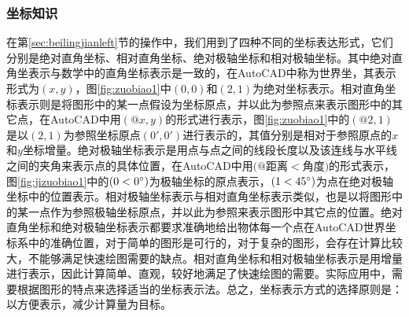 \subsubsection{坐标知识}
在第\ref{sec:beilingjianleft}节的操作中，我们用到了四种不同的坐标表达形式，它们分别是绝对直角坐标、相对直角坐标、绝对极轴坐标和相对极轴坐标。其中绝对直角坐表示与数学中的直角坐标表示是一致的，在AutoCAD中称为世界坐，其表示形式为$(x,y)$，图\ref{fig:zuobiao1}中$(0,0)$和$(2,1)$为绝对坐标表示。相对直角坐标表示则是将图形中的某一点假设为坐标原点，并以此为参照点来表示图形中的其它点，在AutoCAD中用$(@x,y)$的形式进行表示，图\ref{fig:zuobiao1}中的$(@2,1)$是以$(2,1)$为参照坐标原点$(0',0')$进行表示的，其值分别是相对于参照原点的$x$和$y$坐标增量。绝对极轴坐标表示是用点与点之间的线段长度以及该连线与水平线之间的夹角来表示点的具体位置，在AutoCAD中用$(@$距离$<$角度$)$的形式表示，图\ref{fig:jizuobiao1}中的$(0<0\degree)$为极轴坐标的原点表示，$(1<45\degree)$为点在绝对极轴坐标中的位置表示。相对极轴坐标表示与相对直角坐标表示类似，也是以将图形中的某一点作为参照极轴坐标原点，并以此为参照来表示图形中其它点的位置。绝对直角坐标和绝对极轴坐标表示都要求准确地给出物体每一个点在AutoCAD世界坐标系中的准确位置，对于简单的图形是可行的，对于复杂的图形，会存在计算比较大，不能够满足快速绘图需要的缺点。相对直角坐标和相对极轴坐标表示是用增量进行表示，因此计算简单、直观，较好地满足了快速绘图的需要。实际应用中，需要根据图形的特点来选择适当的坐标表示法。总之，坐标表示方式的选择原则是：以方便表示，减少计算量为目标。

